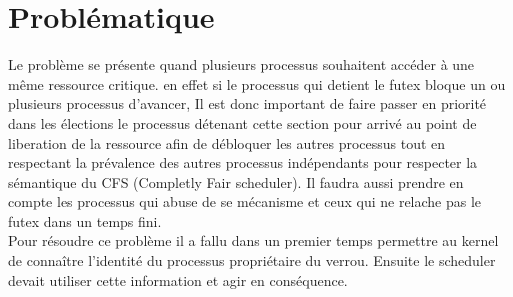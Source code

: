 \section*{Problématique}

Le problème se présente quand plusieurs processus souhaitent accéder à une même
ressource critique. 
en effet si le processus qui detient le futex bloque un ou plusieurs processus 
d'avancer, Il est donc important de faire passer en priorité dans les 
élections le processus détenant cette section pour arrivé au point de 
liberation de la ressource afin de débloquer les autres processus tout en 
respectant la prévalence des autres processus indépendants pour respecter la 
sémantique du CFS  (Completly Fair scheduler).
Il faudra aussi prendre en compte les processus qui abuse de se mécanisme et 
ceux qui ne relache pas le futex dans un temps fini. 
\\

Pour résoudre ce problème il a fallu dans un premier temps permettre au
kernel de connaître l'identité du processus propriétaire du verrou.
Ensuite le scheduler devait utiliser cette information et agir en conséquence.
\\